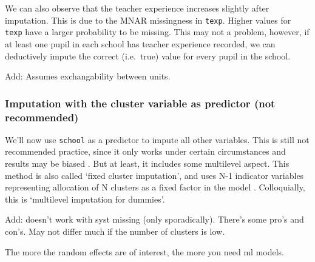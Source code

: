 \documentclass[
]{jss}
\begin{document}
We can also observe that the teacher experience increases slightly after
imputation. This is due to the MNAR missingness in \texttt{texp}. Higher
values for \texttt{texp} have a larger probability to be missing. This
may not a problem, however, if at least one pupil in each school has
teacher experience recorded, we can deductively impute the correct
(i.e.~true) value for every pupil in the school.

Add: Assumes exchangability between units.

\hypertarget{imputation-with-the-cluster-variable-as-predictor-not-recommended}{%
\subsubsection{Imputation with the cluster variable as predictor (not
recommended)}\label{imputation-with-the-cluster-variable-as-predictor-not-recommended}}

We'll now use \texttt{school} as a predictor to impute all other
variables. This is still not recommended practice, since it only works
under certain circumstances and results may be biased
\citep{drec15, ende16}. But at least, it includes some multilevel
aspect. This method is also called `fixed cluster imputation', and uses
N-1 indicator variables representing allocation of N clusters as a fixed
factor in the model \citep{reit06, ende2016}. Colloquially, this is
`multilevel imputation for dummies'.

Add: doesn't work with syst missing (only sporadically). There's some
pro's and con's. May not differ much if the number of clusters is low.

The more the random effects are of interest, the more you need ml
models.

\begin{CodeChunk}
\end{CodeChunk}
\end{document}
